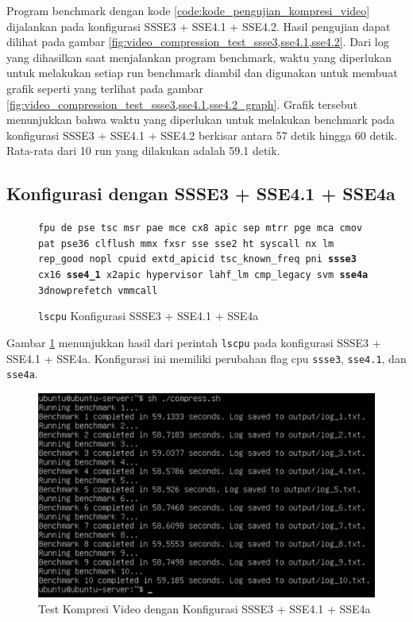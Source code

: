 Program benchmark dengan kode \ref{code:kode_pengujian_kompresi_video} dijalankan pada konfigurasi SSSE3 + SSE4.1 + SSE4.2. Hasil pengujian dapat dilihat pada gambar \ref{fig:video_compression_test_ssse3,sse4.1,sse4.2}. Dari log yang dihasilkan saat menjalankan program benchmark, waktu yang diperlukan untuk melakukan setiap run benchmark diambil dan digunakan untuk membuat grafik seperti yang terlihat pada gambar \ref{fig:video_compression_test_ssse3,sse4.1,sse4.2_graph}. Grafik tersebut menunjukkan bahwa waktu yang diperlukan untuk melakukan benchmark pada konfigurasi SSSE3 + SSE4.1 + SSE4.2 berkisar antara 57 detik hingga 60 detik. Rata-rata dari 10 run yang dilakukan adalah 59.1 detik.

\subsection{Konfigurasi dengan SSSE3 + SSE4.1 + SSE4a}
\begin{figure}
    \texttt{fpu de pse tsc msr pae mce cx8 apic sep mtrr pge mca cmov pat pse36 clflush mmx fxsr sse sse2 ht syscall nx lm rep\_good nopl cpuid extd\_apicid tsc\_known\_freq pni \textbf{ssse3} cx16 \textbf{sse4\_1} x2apic hypervisor lahf\_lm cmp\_legacy svm \textbf{sse4a} 3dnowprefetch vmmcall}
    \caption{\texttt{lscpu} Konfigurasi SSSE3 + SSE4.1 + SSE4a}
    \label{fig:lscpu_video_compression_test_ssse3,sse4.1,sse4a}
\end{figure}

Gambar \ref{fig:lscpu_video_compression_test_ssse3,sse4.1,sse4a} menunjukkan hasil dari perintah \texttt{lscpu} pada konfigurasi SSSE3 + SSE4.1 + SSE4a. Konfigurasi ini memiliki perubahan flag cpu \texttt{ssse3}, \texttt{sse4.1}, dan \texttt{sse4a}.

\begin{figure}
    \centering
    \includegraphics[width=1\textwidth]
    {assets/pics/video-compression-test/ssse3,sse4.1,sse4a.jpeg}
    \caption{Test Kompresi Video dengan Konfigurasi SSSE3 + SSE4.1 + SSE4a}
    \label{fig:video_compression_test_ssse3,sse4.1,sse4a}
\end{figure}

